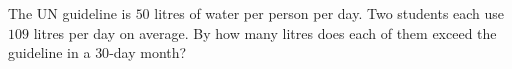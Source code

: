 The UN guideline is $50$ litres of water per person per day. Two students each use $109$ litres per day on average. By how many litres does each of them exceed the guideline in a $30$-day month?
